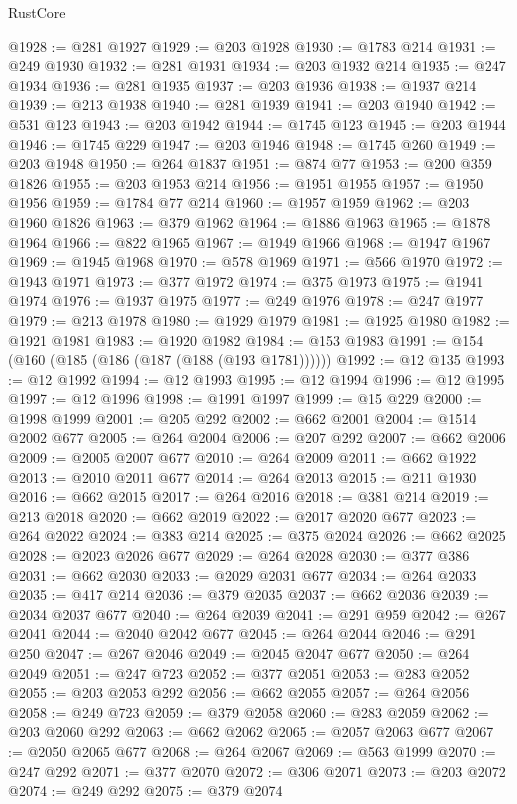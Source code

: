 \begin{lexlean}{RustCore}
\begin{coremodule}
@1928 := @281 @1927
@1929 := @203 @1928
@1930 := @1783 @214
@1931 := @249 @1930
@1932 := @281 @1931
@1934 := @203 @1932 @214
@1935 := @247 @1934
@1936 := @281 @1935
@1937 := @203 @1936
@1938 := @1937 @214
@1939 := @213 @1938
@1940 := @281 @1939
@1941 := @203 @1940
@1942 := @531 @123
@1943 := @203 @1942
@1944 := @1745 @123
@1945 := @203 @1944
@1946 := @1745 @229
@1947 := @203 @1946
@1948 := @1745 @260
@1949 := @203 @1948
@1950 := @264 @1837
@1951 := @874 @77
@1953 := @200 @359 @1826
@1955 := @203 @1953 @214
@1956 := @1951 @1955
@1957 := @1950 @1956
@1959 := @1784 @77 @214
@1960 := @1957 @1959
@1962 := @203 @1960 @1826
@1963 := @379 @1962
@1964 := @1886 @1963
@1965 := @1878 @1964
@1966 := @822 @1965
@1967 := @1949 @1966
@1968 := @1947 @1967
@1969 := @1945 @1968
@1970 := @578 @1969
@1971 := @566 @1970
@1972 := @1943 @1971
@1973 := @377 @1972
@1974 := @375 @1973
@1975 := @1941 @1974
@1976 := @1937 @1975
@1977 := @249 @1976
@1978 := @247 @1977
@1979 := @213 @1978
@1980 := @1929 @1979
@1981 := @1925 @1980
@1982 := @1921 @1981
@1983 := @1920 @1982
@1984 := @153 @1983
@1991 := @154 (@160 (@185 (@186 (@187 (@188 (@193 @1781))))))
@1992 := @12 @135
@1993 := @12 @1992
@1994 := @12 @1993
@1995 := @12 @1994
@1996 := @12 @1995
@1997 := @12 @1996
@1998 := @1991 @1997
@1999 := @15 @229
@2000 := @1998 @1999
@2001 := @205 @292
@2002 := @662 @2001
@2004 := @1514 @2002 @677
@2005 := @264 @2004
@2006 := @207 @292
@2007 := @662 @2006
@2009 := @2005 @2007 @677
@2010 := @264 @2009
@2011 := @662 @1922
@2013 := @2010 @2011 @677
@2014 := @264 @2013
@2015 := @211 @1930
@2016 := @662 @2015
@2017 := @264 @2016
@2018 := @381 @214
@2019 := @213 @2018
@2020 := @662 @2019
@2022 := @2017 @2020 @677
@2023 := @264 @2022
@2024 := @383 @214
@2025 := @375 @2024
@2026 := @662 @2025
@2028 := @2023 @2026 @677
@2029 := @264 @2028
@2030 := @377 @386
@2031 := @662 @2030
@2033 := @2029 @2031 @677
@2034 := @264 @2033
@2035 := @417 @214
@2036 := @379 @2035
@2037 := @662 @2036
@2039 := @2034 @2037 @677
@2040 := @264 @2039
@2041 := @291 @959
@2042 := @267 @2041
@2044 := @2040 @2042 @677
@2045 := @264 @2044
@2046 := @291 @250
@2047 := @267 @2046
@2049 := @2045 @2047 @677
@2050 := @264 @2049
@2051 := @247 @723
@2052 := @377 @2051
@2053 := @283 @2052
@2055 := @203 @2053 @292
@2056 := @662 @2055
@2057 := @264 @2056
@2058 := @249 @723
@2059 := @379 @2058
@2060 := @283 @2059
@2062 := @203 @2060 @292
@2063 := @662 @2062
@2065 := @2057 @2063 @677
@2067 := @2050 @2065 @677
@2068 := @264 @2067
@2069 := @563 @1999
@2070 := @247 @292
@2071 := @377 @2070
@2072 := @306 @2071
@2073 := @203 @2072
@2074 := @249 @292
@2075 := @379 @2074

\end{coremodule}
\end{lexlean}
